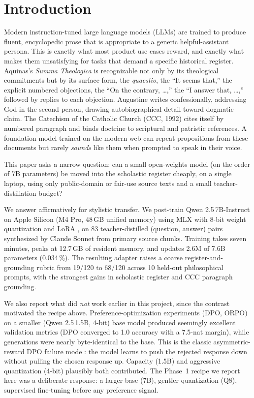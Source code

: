 \section{Introduction}

Modern instruction-tuned large language models (LLMs) are trained to produce
fluent, encyclopedic prose that is appropriate to a generic helpful-assistant
persona. This is exactly what most product use cases reward, and exactly
what makes them unsatisfying for tasks that demand a specific historical
register. Aquinas's \emph{Summa Theologica} is recognizable not only by its
theological commitments but by its surface form, the \emph{quaestio}, the
``It seems that,'' the explicit numbered objections, the ``On the contrary,
\dots,'' the ``I answer that, \dots,'' followed by replies to each
objection. Augustine writes confessionally, addressing God in the second
person, drawing autobiographical detail toward dogmatic claim. The
Catechism of the Catholic Church (CCC, 1992) cites itself by numbered
paragraph and binds doctrine to scriptural and patristic references. A
foundation model trained on the modern web can repeat propositions from
these documents but rarely \emph{sounds} like them when prompted to speak in
their voice.

This paper asks a narrow question: can a small open-weights model (on the
order of 7B parameters) be moved into the scholastic register cheaply, on
a single laptop, using only public-domain or fair-use source texts and a
small teacher-distillation budget?

We answer affirmatively for stylistic transfer. We post-train Qwen
2.5\,7B-Instruct \cite{qwen25} on Apple Silicon (M4 Pro, 48\,GB unified
memory) using MLX \cite{mlx} with 8-bit weight quantization and LoRA
\cite{lora}, on 83 teacher-distilled (question, answer) pairs synthesized by
Claude Sonnet from primary source chunks. Training takes seven minutes,
peaks at 12.7\,GB of resident memory, and updates 2.6M of 7.6B parameters
(0.034\,\%). The resulting adapter raises a coarse register-and-grounding
rubric from 19/120 to 68/120 across 10 held-out philosophical prompts, with
the strongest gains in scholastic register and CCC paragraph grounding.

We also report what did \emph{not} work earlier in this project, since the
contrast motivated the recipe above. Preference-optimization experiments
(DPO, ORPO) on a smaller (Qwen 2.5\,1.5B, 4-bit) base model produced
seemingly excellent validation metrics (DPO converged to 1.0 accuracy
with a 7.5-nat margin), while generations were nearly byte-identical to the
base. This is the classic asymmetric-reward DPO failure mode
\cite{rafailov2023dpo}: the model learns to push the rejected response down
without pulling the chosen response up. Capacity (1.5B) and aggressive
quantization (4-bit) plausibly both contributed. The Phase~1 recipe we
report here was a deliberate response: a larger base (7B), gentler
quantization (Q8), supervised fine-tuning before any preference signal.

